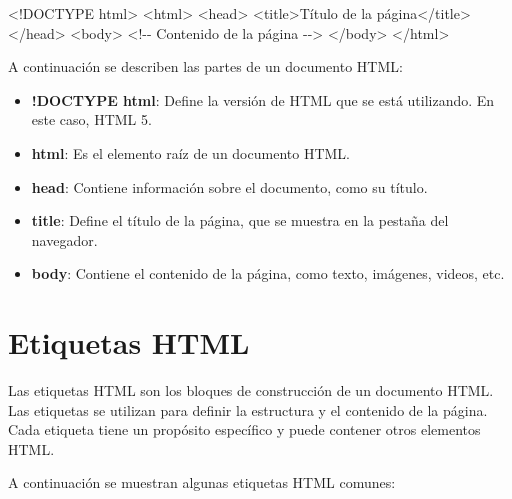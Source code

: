 \documentclass[
  a4paper,
  DIV=11,
  numbers=noendperiod,
  onepage,
  openany]{scrreprt}
\newenvironment{Shaded}{\begin{snugshade}}{\end{snugshade}}
\newcommand{\CommentTok}[1]{\textcolor[rgb]{0.37,0.37,0.37}{#1}}
\newcommand{\DataTypeTok}[1]{\textcolor[rgb]{0.68,0.00,0.00}{#1}}
\newcommand{\KeywordTok}[1]{\textcolor[rgb]{0.00,0.23,0.31}{#1}}
\newcommand{\NormalTok}[1]{\textcolor[rgb]{0.00,0.23,0.31}{#1}}
\providecommand{\tightlist}{%
  \setlength{\itemsep}{0pt}\setlength{\parskip}{0pt}}\usepackage{longtable,booktabs,array}
\begin{document}
\begin{Shaded}
\begin{Highlighting}[]
\DataTypeTok{\textless{}!DOCTYPE }\NormalTok{html}\DataTypeTok{\textgreater{}}
\DataTypeTok{\textless{}}\KeywordTok{html}\DataTypeTok{\textgreater{}}
    \DataTypeTok{\textless{}}\KeywordTok{head}\DataTypeTok{\textgreater{}}
        \DataTypeTok{\textless{}}\KeywordTok{title}\DataTypeTok{\textgreater{}}\NormalTok{Título de la página}\DataTypeTok{\textless{}/}\KeywordTok{title}\DataTypeTok{\textgreater{}}
    \DataTypeTok{\textless{}/}\KeywordTok{head}\DataTypeTok{\textgreater{}}
    \DataTypeTok{\textless{}}\KeywordTok{body}\DataTypeTok{\textgreater{}}
        \CommentTok{\textless{}!{-}{-} Contenido de la página {-}{-}\textgreater{}}
    \DataTypeTok{\textless{}/}\KeywordTok{body}\DataTypeTok{\textgreater{}}
\DataTypeTok{\textless{}/}\KeywordTok{html}\DataTypeTok{\textgreater{}}
\end{Highlighting}
\end{Shaded}

A continuación se describen las partes de un documento HTML:

\begin{itemize}
\tightlist
\item
  \textbf{!DOCTYPE html}: Define la versión de HTML que se está
  utilizando. En este caso, HTML 5.
\item
  \textbf{html}: Es el elemento raíz de un documento HTML.
\item
  \textbf{head}: Contiene información sobre el documento, como su
  título.
\item
  \textbf{title}: Define el título de la página, que se muestra en la
  pestaña del navegador.
\item
  \textbf{body}: Contiene el contenido de la página, como texto,
  imágenes, videos, etc.
\end{itemize}

\section{Etiquetas HTML}\label{etiquetas-html}

Las etiquetas HTML son los bloques de construcción de un documento HTML.
Las etiquetas se utilizan para definir la estructura y el contenido de
la página. Cada etiqueta tiene un propósito específico y puede contener
otros elementos HTML.

A continuación se muestran algunas etiquetas HTML comunes:
\end{document}
